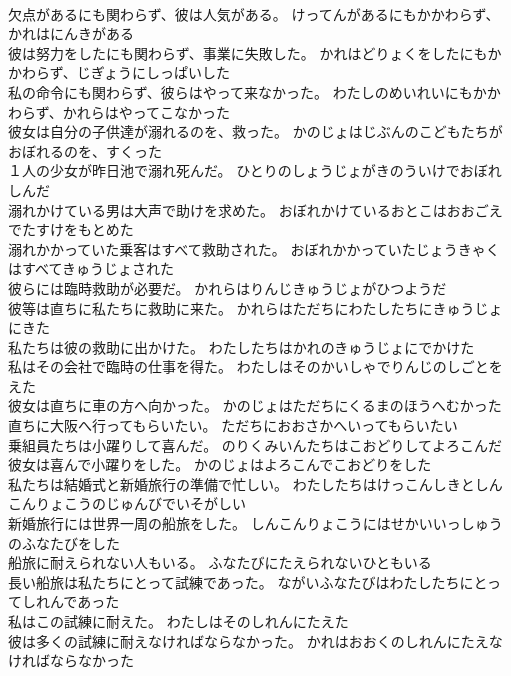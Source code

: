 \documentclass[8pt]{extreport}
\begin{document}
\begin{CJK}{UTF8}{min}
\\	欠点があるにも関わらず、彼は人気がある。	けってんがあるにもかかわらず、かれはにんきがある 
\\	彼は努力をしたにも関わらず、事業に失敗した。	かれはどりょくをしたにもかかわらず、じぎょうにしっぱいした 
\\	私の命令にも関わらず、彼らはやって来なかった。	わたしのめいれいにもかかわらず、かれらはやってこなかった 
\\	彼女は自分の子供達が溺れるのを、救った。	かのじょはじぶんのこどもたちがおぼれるのを、すくった 
\\	１人の少女が昨日池で溺れ死んだ。	ひとりのしょうじょがきのういけでおぼれしんだ 
\\	溺れかけている男は大声で助けを求めた。	おぼれかけているおとこはおおごえでたすけをもとめた 
\\	溺れかかっていた乗客はすべて救助された。	おぼれかかっていたじょうきゃくはすべてきゅうじょされた 
\\	彼らには臨時救助が必要だ。	かれらはりんじきゅうじょがひつようだ 
\\	彼等は直ちに私たちに救助に来た。	かれらはただちにわたしたちにきゅうじょにきた 
\\	私たちは彼の救助に出かけた。	わたしたちはかれのきゅうじょにでかけた 
\\	私はその会社で臨時の仕事を得た。	わたしはそのかいしゃでりんじのしごとをえた 
\\	彼女は直ちに車の方へ向かった。	かのじょはただちにくるまのほうへむかった 
\\	直ちに大阪へ行ってもらいたい。	ただちにおおさかへいってもらいたい 
\\	乗組員たちは小躍りして喜んだ。	のりくみいんたちはこおどりしてよろこんだ 
\\	彼女は喜んで小躍りをした。	かのじょはよろこんでこおどりをした 
\\	私たちは結婚式と新婚旅行の準備で忙しい。	わたしたちはけっこんしきとしんこんりょこうのじゅんびでいそがしい 
\\	新婚旅行には世界一周の船旅をした。	しんこんりょこうにはせかいいっしゅうのふなたびをした 
\\	船旅に耐えられない人もいる。	ふなたびにたえられないひともいる 
\\	長い船旅は私たちにとって試練であった。	ながいふなたびはわたしたちにとってしれんであった 
\\	私はこの試練に耐えた。	わたしはそのしれんにたえた 
\\	彼は多くの試練に耐えなければならなかった。	かれはおおくのしれんにたえなければならなかった 

\end{CJK}
\end{document}
